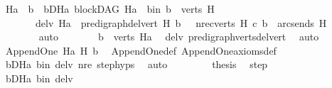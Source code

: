 \begin{isabellebody}
\ Ha\ \ b\ \ bD{\isacharunderscore}{\kern0pt}Ha{\isacharcolon}{\kern0pt}\ {\isachardoublequoteopen}blockDAG\ Ha{\isachardoublequoteclose}\ \ b{\isacharunderscore}{\kern0pt}in{\isacharcolon}{\kern0pt}\ {\isachardoublequoteopen}b\ {\isasymin}\ verts\ H{\isachardoublequoteclose}\isanewline
\ \ \ \ \ \ \ del{\isacharunderscore}{\kern0pt}v{\isacharcolon}{\kern0pt}\ {\isachardoublequoteopen}Ha\ {\isacharequal}{\kern0pt}\ pre{\isacharunderscore}{\kern0pt}digraph{\isachardot}{\kern0pt}del{\isacharunderscore}{\kern0pt}vert\ H\ b\ {\isachardoublequoteclose}\ \ nre{\isacharcolon}{\kern0pt}{\isachardoublequoteopen}{\isacharparenleft}{\kern0pt}{\isasymforall}c{\isasymin}verts\ H{\isachardot}{\kern0pt}\ {\isacharparenleft}{\kern0pt}c{\isacharcomma}{\kern0pt}\ b{\isacharparenright}{\kern0pt}\ {\isasymnotin}\ {\isacharparenleft}{\kern0pt}arcs{\isacharunderscore}{\kern0pt}ends\ H{\isacharparenright}{\kern0pt}\isactrlsup {\isacharplus}{\kern0pt}{\isacharparenright}{\kern0pt}{\isachardoublequoteclose}\isanewline
\ \ \ \ \ \ \isamarkupfalse%
\ auto\isanewline
\ \ \ \ \isamarkupfalse%
\ \isamarkupfalse%
\ {\isachardoublequoteopen}b\ {\isasymnotin}\ verts\ Ha{\isachardoublequoteclose}\ \isamarkupfalse%
\ del{\isacharunderscore}{\kern0pt}v\ pre{\isacharunderscore}{\kern0pt}digraph{\isachardot}{\kern0pt}verts{\isacharunderscore}{\kern0pt}del{\isacharunderscore}{\kern0pt}vert\ \isamarkupfalse%
\ auto\isanewline
\ \ \ \ \isamarkupfalse%
\ \isamarkupfalse%
\ {\isachardoublequoteopen}Append{\isacharunderscore}{\kern0pt}One\ Ha\ H\ b{\isachardoublequoteclose}\ \isamarkupfalse%
\ Append{\isacharunderscore}{\kern0pt}One{\isacharunderscore}{\kern0pt}def\ Append{\isacharunderscore}{\kern0pt}One{\isacharunderscore}{\kern0pt}axioms{\isacharunderscore}{\kern0pt}def\ \isanewline
\ \ \ \ \ \ \isamarkupfalse%
\ bD{\isacharunderscore}{\kern0pt}Ha\ b{\isacharunderscore}{\kern0pt}in\ del{\isacharunderscore}{\kern0pt}v\ nre\ step{\isachardot}{\kern0pt}hyps{\isacharparenleft}{\kern0pt}{}{\isacharparenright}{\kern0pt}\ \isamarkupfalse%
\ auto\ \isanewline
\ \ \ \ \isamarkupfalse%
\ \isamarkupfalse%
\ {\isacharquery}{\kern0pt}thesis\ \isamarkupfalse%
\ step\isanewline
\ \ \ \ \ \ \isamarkupfalse%
\ bD{\isacharunderscore}{\kern0pt}Ha\ b{\isacharunderscore}{\kern0pt}in\ del{\isacharunderscore}{\kern0pt}v\ \isamarkupfalse%

\end{isabellebody}
